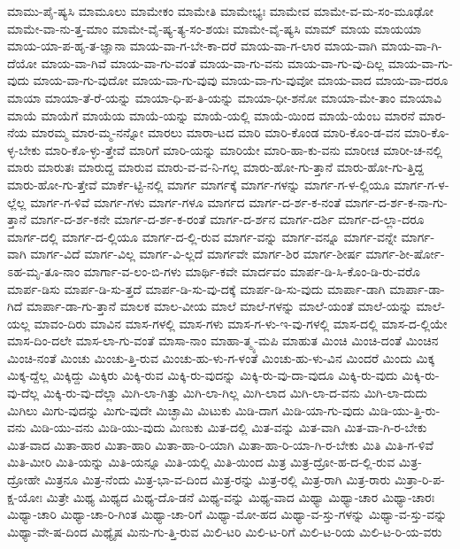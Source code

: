 {ಮಾಮು-ಪೈ-ಷ್ಯಸಿ
ಮಾಮೂಲು
ಮಾಮೇಕಂ
ಮಾಮೇತಿ
ಮಾಮೇಭ್ಯಃ
ಮಾಮೇವ
ಮಾಮೇ-ವ-ಮ-ಸಂ-ಮೂಢೋ
ಮಾಮೇ-ವಾ-ನು-ತ್ತ-ಮಾಂ
ಮಾಮೇ-ವೈ-ಷ್ಯ-ತ್ಯ-ಸಂ-ಶಯಃ
ಮಾಮೇ-ವೈ-ಷ್ಯಸಿ
ಮಾಮ್
ಮಾಯ
ಮಾಯಯಾ
ಮಾಯ-ಯಾ-ಪ-ಹೃ-ತ-ಜ್ಞಾನಾ
ಮಾಯ-ವಾ-ಗ-ಬೇ-ಕಾ-ದರೆ
ಮಾಯ-ವಾ-ಗ-ಲಾರ
ಮಾಯ-ವಾಗಿ
ಮಾಯ-ವಾ-ಗಿ-ದೆಯೋ
ಮಾಯ-ವಾ-ಗಿವೆ
ಮಾಯ-ವಾ-ಗು-ವಂತೆ
ಮಾಯ-ವಾ-ಗು-ವನು
ಮಾಯ-ವಾ-ಗು-ವು-ದಿಲ್ಲ
ಮಾಯ-ವಾ-ಗು-ವುದು
ಮಾಯ-ವಾ-ಗು-ವುದೋ
ಮಾಯ-ವಾ-ಗು-ವುವು
ಮಾಯ-ವಾ-ಗು-ವುವೋ
ಮಾಯ-ವಾದ
ಮಾಯ-ವಾ-ದರೂ
ಮಾಯಾ
ಮಾಯಾ-ತೆ-ರೆ-ಯನ್ನು
ಮಾಯಾ-ಧಿ-ಪ-ತಿ-ಯನ್ನು
ಮಾಯಾ-ಧೀ-ಶನೋ
ಮಾಯಾ-ಮೇ-ತಾಂ
ಮಾಯಾವಿ
ಮಾಯೆ
ಮಾಯೆಗೆ
ಮಾಯೆಯ
ಮಾಯೆ-ಯನ್ನು
ಮಾಯೆ-ಯಲ್ಲಿ
ಮಾಯೆ-ಯಿಂದ
ಮಾಯೆ-ಯೆಂಬ
ಮಾರನೆ
ಮಾರ-ನೆಯ
ಮಾರಮ್ಮ
ಮಾರ-ಮ್ಮ-ನನ್ನೋ
ಮಾರಲು
ಮಾರಾ-ಟದ
ಮಾರಿ
ಮಾರಿ-ಕೊಂಡ
ಮಾರಿ-ಕೊಂ-ಡ-ವನ
ಮಾರಿ-ಕೊ-ಳ್ಳ-ಬೇಕು
ಮಾರಿ-ಕೊ-ಳ್ಳು-ತ್ತೇವೆ
ಮಾರಿಗೆ
ಮಾರಿ-ಯನ್ನು
ಮಾರಿಯೇ
ಮಾರಿ-ಹಾ-ಕು-ವನು
ಮಾರೀಚ
ಮಾರೀ-ಚ-ನಲ್ಲಿ
ಮಾರು
ಮಾರುತಃ
ಮಾರುದ್ದ
ಮಾರುವ
ಮಾರು-ವ-ವ-ನಿ-ಗಲ್ಲ
ಮಾರು-ಹೋ-ಗು-ತ್ತಾನೆ
ಮಾರು-ಹೋ-ಗು-ತ್ತಿದ್ದ
ಮಾರು-ಹೋ-ಗು-ತ್ತೇವೆ
ಮಾರ್ಕೆ-ಟ್ಟಿ-ನಲ್ಲಿ
ಮಾರ್ಗ
ಮಾರ್ಗಕ್ಕೆ
ಮಾರ್ಗ-ಗಳನ್ನು
ಮಾರ್ಗ-ಗ-ಳ-ಲ್ಲಿಯೂ
ಮಾರ್ಗ-ಗ-ಳ-ಲ್ಲೆಲ್ಲ
ಮಾರ್ಗ-ಗ-ಳಿವೆ
ಮಾರ್ಗ-ಗಳು
ಮಾರ್ಗ-ಗಳೂ
ಮಾರ್ಗದ
ಮಾರ್ಗ-ದ-ರ್ಶ-ಕ-ನಂತೆ
ಮಾರ್ಗ-ದ-ರ್ಶ-ಕ-ನಾ-ಗು-ತ್ತಾನೆ
ಮಾರ್ಗ-ದ-ರ್ಶ-ಕನೇ
ಮಾರ್ಗ-ದ-ರ್ಶ-ಕ-ರಂತೆ
ಮಾರ್ಗ-ದ-ರ್ಶನ
ಮಾರ್ಗ-ದರ್ಶಿ
ಮಾರ್ಗ-ದ-ಲ್ಲಾ-ದರೂ
ಮಾರ್ಗ-ದಲ್ಲಿ
ಮಾರ್ಗ-ದ-ಲ್ಲಿಯೂ
ಮಾರ್ಗ-ದ-ಲ್ಲಿ-ರುವ
ಮಾರ್ಗ-ವನ್ನು
ಮಾರ್ಗ-ವನ್ನೂ
ಮಾರ್ಗ-ವನ್ನೇ
ಮಾರ್ಗ-ವಾಗಿ
ಮಾರ್ಗ-ವಿದೆ
ಮಾರ್ಗ-ವಿಲ್ಲ
ಮಾರ್ಗ-ವಿ-ಲ್ಲದೆ
ಮಾರ್ಗವೇ
ಮಾರ್ಗ-ಶಿರ
ಮಾರ್ಗ-ಶೀರ್ಷ
ಮಾರ್ಗ-ಶೀ-ರ್ಷೋ-ಽಹ-ಮೃ-ತೂ-ನಾಂ
ಮಾರ್ಗಾ-ವ-ಲಂ-ಬಿ-ಗಳು
ಮಾರ್ಥಿ-ಕವೇ
ಮಾರ್ದವಂ
ಮಾರ್ಪ-ಡಿ-ಸಿ-ಕೊಂ-ಡಿ-ರು-ವರೊ
ಮಾರ್ಪ-ಡಿಸು
ಮಾರ್ಪ-ಡಿ-ಸು-ತ್ತದೆ
ಮಾರ್ಪ-ಡಿ-ಸು-ವು-ದಕ್ಕೆ
ಮಾರ್ಪ-ಡಿ-ಸು-ವುದು
ಮಾರ್ಪಾ-ಡಾಗಿ
ಮಾರ್ಪಾ-ಡಾ-ಗಿದೆ
ಮಾರ್ಪಾ-ಡಾ-ಗು-ತ್ತಾನೆ
ಮಾಲಕ
ಮಾಲ-ವೀಯ
ಮಾಲೆ
ಮಾಲೆ-ಗಳನ್ನು
ಮಾಲೆ-ಯಂತೆ
ಮಾಲೆ-ಯನ್ನು
ಮಾಲೆ-ಯಲ್ಲ
ಮಾವಂ-ದಿರು
ಮಾವಿನ
ಮಾಸ-ಗಳಲ್ಲಿ
ಮಾಸ-ಗಳು
ಮಾಸ-ಗ-ಳು-ಇ-ವು-ಗಳಲ್ಲಿ
ಮಾಸ-ದಲ್ಲಿ
ಮಾಸ-ದ-ಲ್ಲಿಯೇ
ಮಾಸ-ದಿಂ-ದಲೇ
ಮಾಸ-ಲಾ-ಗು-ವಂತೆ
ಮಾಸಾ-ನಾಂ
ಮಾಹಾ-ತ್ಮ್ಯ-ಮಪಿ
ಮಾಹುತ
ಮಿಂಚಿ
ಮಿಂಚಿ-ದಂತೆ
ಮಿಂಚಿನ
ಮಿಂಚಿ-ನಂತೆ
ಮಿಂಚು
ಮಿಂಚು-ತ್ತಿ-ರುವ
ಮಿಂಚು-ಹು-ಳು-ಗ-ಳಂತೆ
ಮಿಂಚು-ಹು-ಳು-ವಿನ
ಮಿಂದರೆ
ಮಿಂದು
ಮಿಕ್ಕ
ಮಿಕ್ಕ-ದ್ದೆಲ್ಲ
ಮಿಕ್ಕಿದ್ದು
ಮಿಕ್ಕಿರು
ಮಿಕ್ಕಿ-ರುವ
ಮಿಕ್ಕಿ-ರು-ವುದನ್ನು
ಮಿಕ್ಕಿ-ರು-ವು-ದಾ-ವುದೂ
ಮಿಕ್ಕಿ-ರು-ವುದು
ಮಿಕ್ಕಿ-ರು-ವು-ದೆಲ್ಲ
ಮಿಕ್ಕಿ-ರು-ವು-ದೆಲ್ಲಾ
ಮಿಗಿ-ಲಾ-ಗಿತ್ತು
ಮಿಗಿ-ಲಾ-ಗಿಲ್ಲ
ಮಿಗಿ-ಲಾದ
ಮಿಗಿ-ಲಾ-ದ-ವನು
ಮಿಗಿ-ಲಾ-ದುದು
ಮಿಗಿಲು
ಮಿಗು-ವುದನ್ನು
ಮಿಗು-ವುದೇ
ಮಿಚ್ಛಾಮಿ
ಮಿಟುಕು
ಮಿಡಿ-ದಾಗ
ಮಿಡಿ-ಯಾ-ಗು-ವುದು
ಮಿಡಿ-ಯು-ತ್ತಿ-ರು-ವನು
ಮಿಡಿ-ಯು-ವನು
ಮಿಡಿ-ಯು-ವುದು
ಮಿಣುಕು
ಮಿತ-ದಲ್ಲಿ
ಮಿತ-ವನ್ನು
ಮಿತ-ವಾಗಿ
ಮಿತ-ವಾ-ಗಿ-ರ-ಬೇಕು
ಮಿತ-ವಾದ
ಮಿತಾ-ಹಾರ
ಮಿತಾ-ಹಾರಿ
ಮಿತಾ-ಹಾ-ರಿ-ಯಾಗಿ
ಮಿತಾ-ಹಾ-ರಿ-ಯಾ-ಗಿ-ರ-ಬೇಕು
ಮಿತಿ
ಮಿತಿ-ಗ-ಳಿವೆ
ಮಿತಿ-ಮೀರಿ
ಮಿತಿ-ಯನ್ನು
ಮಿತಿ-ಯನ್ನೂ
ಮಿತಿ-ಯಲ್ಲಿ
ಮಿತಿ-ಯಿಂದ
ಮಿತ್ರ
ಮಿತ್ರ-ದ್ರೋ-ಹ-ದ-ಲ್ಲಿ-ರುವ
ಮಿತ್ರ-ದ್ರೋಹೇ
ಮಿತ್ರನೂ
ಮಿತ್ರ-ನೆಂದು
ಮಿತ್ರ-ಭಾ-ವ-ದಿಂದ
ಮಿತ್ರ-ರನ್ನು
ಮಿತ್ರ-ರಲ್ಲಿ
ಮಿತ್ರ-ರಾಗಿ
ಮಿತ್ರ-ರಾರು
ಮಿತ್ರಾ-ರಿ-ಪ-ಕ್ಷ-ಯೋಃ
ಮಿತ್ರೇ
ಮಿಥ್ಯ
ಮಿಥ್ಯದ
ಮಿಥ್ಯ-ದೊ-ಡನೆ
ಮಿಥ್ಯ-ವನ್ನು
ಮಿಥ್ಯ-ವಾದ
ಮಿಥ್ಯಾ
ಮಿಥ್ಯಾ-ಚಾರ
ಮಿಥ್ಯಾ-ಚಾರಃ
ಮಿಥ್ಯಾ-ಚಾರಿ
ಮಿಥ್ಯಾ-ಚಾ-ರಿ-ಗಿಂತ
ಮಿಥ್ಯಾ-ಚಾ-ರಿಗೆ
ಮಿಥ್ಯಾ-ಮೋ-ಹದ
ಮಿಥ್ಯಾ-ವ-ಸ್ತು-ಗಳನ್ನು
ಮಿಥ್ಯಾ-ವ-ಸ್ತು-ವನ್ನು
ಮಿಥ್ಯಾ-ವೇ-ಷ-ದಿಂದ
ಮಿಥ್ಯೈಷ
ಮಿನು-ಗು-ತ್ತಿ-ರುವ
ಮಿಲಿ-ಟರಿ
ಮಿಲಿ-ಟ-ರಿಗೆ
ಮಿಲಿ-ಟ-ರಿಯ
ಮಿಲಿ-ಟ-ರಿ-ಯ-ವರು
}
